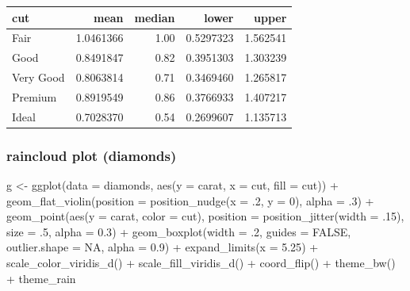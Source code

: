 \documentclass[
]{article}
\newenvironment{Shaded}{\begin{snugshade}}{\end{snugshade}}
\newcommand{\AttributeTok}[1]{\textcolor[rgb]{0.77,0.63,0.00}{#1}}
\newcommand{\ConstantTok}[1]{\textcolor[rgb]{0.00,0.00,0.00}{#1}}
\newcommand{\DecValTok}[1]{\textcolor[rgb]{0.00,0.00,0.81}{#1}}
\newcommand{\FloatTok}[1]{\textcolor[rgb]{0.00,0.00,0.81}{#1}}
\newcommand{\FunctionTok}[1]{\textcolor[rgb]{0.00,0.00,0.00}{#1}}
\newcommand{\NormalTok}[1]{#1}
\newcommand{\OtherTok}[1]{\textcolor[rgb]{0.56,0.35,0.01}{#1}}
\newcommand{\SpecialCharTok}[1]{\textcolor[rgb]{0.00,0.00,0.00}{#1}}
\begin{document}
\begin{table}
\centering
\begin{tabular}{l|r|r|r|r}
\hline
cut & mean & median & lower & upper\\
\hline
Fair & 1.0461366 & 1.00 & 0.5297323 & 1.562541\\
\hline
Good & 0.8491847 & 0.82 & 0.3951303 & 1.303239\\
\hline
Very Good & 0.8063814 & 0.71 & 0.3469460 & 1.265817\\
\hline
Premium & 0.8919549 & 0.86 & 0.3766933 & 1.407217\\
\hline
Ideal & 0.7028370 & 0.54 & 0.2699607 & 1.135713\\
\hline
\end{tabular}
\end{table}

\hypertarget{raincloud-plot-diamonds}{%
\subsubsection{raincloud plot (diamonds)}\label{raincloud-plot-diamonds}}

\begin{Shaded}
\begin{Highlighting}[]
\NormalTok{g }\OtherTok{\textless{}{-}} \FunctionTok{ggplot}\NormalTok{(}\AttributeTok{data =}\NormalTok{ diamonds, }\FunctionTok{aes}\NormalTok{(}\AttributeTok{y =}\NormalTok{ carat, }\AttributeTok{x =}\NormalTok{ cut, }\AttributeTok{fill =}\NormalTok{ cut)) }\SpecialCharTok{+}
\FunctionTok{geom\_flat\_violin}\NormalTok{(}\AttributeTok{position =} \FunctionTok{position\_nudge}\NormalTok{(}\AttributeTok{x =}\NormalTok{ .}\DecValTok{2}\NormalTok{, }\AttributeTok{y =} \DecValTok{0}\NormalTok{), }\AttributeTok{alpha =}\NormalTok{ .}\DecValTok{3}\NormalTok{) }\SpecialCharTok{+}
\FunctionTok{geom\_point}\NormalTok{(}\FunctionTok{aes}\NormalTok{(}\AttributeTok{y =}\NormalTok{ carat, }\AttributeTok{color =}\NormalTok{ cut), }\AttributeTok{position =} \FunctionTok{position\_jitter}\NormalTok{(}\AttributeTok{width =}\NormalTok{ .}\DecValTok{15}\NormalTok{), }\AttributeTok{size =}\NormalTok{ .}\DecValTok{5}\NormalTok{, }\AttributeTok{alpha =} \FloatTok{0.3}\NormalTok{) }\SpecialCharTok{+}
\FunctionTok{geom\_boxplot}\NormalTok{(}\AttributeTok{width =}\NormalTok{ .}\DecValTok{2}\NormalTok{, }\AttributeTok{guides =} \ConstantTok{FALSE}\NormalTok{, }\AttributeTok{outlier.shape =} \ConstantTok{NA}\NormalTok{, }\AttributeTok{alpha =} \FloatTok{0.9}\NormalTok{) }\SpecialCharTok{+}
\FunctionTok{expand\_limits}\NormalTok{(}\AttributeTok{x =} \FloatTok{5.25}\NormalTok{) }\SpecialCharTok{+}
\FunctionTok{scale\_color\_viridis\_d}\NormalTok{() }\SpecialCharTok{+}
\FunctionTok{scale\_fill\_viridis\_d}\NormalTok{() }\SpecialCharTok{+}
\FunctionTok{coord\_flip}\NormalTok{() }\SpecialCharTok{+}
\FunctionTok{theme\_bw}\NormalTok{() }\SpecialCharTok{+}
\NormalTok{theme\_rain}
\end{Highlighting}
\end{Shaded}
\end{document}
